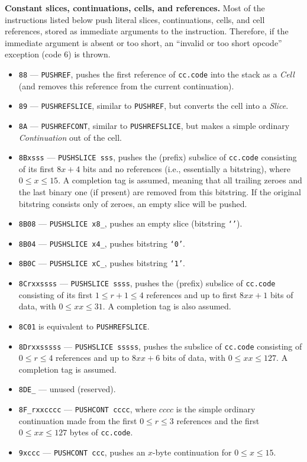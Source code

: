 \documentclass[12pt,oneside]{article}
\def\makepoint#1{\medbreak\noindent{\bf #1.\ }}
\def\nxsubpoint{\refstepcounter{subsubsection}%
    \smallbreak\makepoint{\thesubsubsection}}
\def\emb#1{\textbf{#1.}}
\begin{document}
\nxsubpoint\emb{Constant slices, continuations, cells, and references}
Most of the instructions listed below push literal slices, continuations, cells, and cell references, stored as immediate arguments to the instruction. Therefore, if the immediate argument is absent or too short, an ``invalid or too short opcode'' exception (code $6$) is thrown.
\begin{itemize}
\item {\tt 88} --- {\tt PUSHREF}, pushes the first reference of {\tt cc.code} into the stack as a {\em Cell} (and removes this reference from the current continuation).
\item {\tt 89} --- {\tt PUSHREFSLICE}, similar to {\tt PUSHREF}, but converts the cell into a {\em Slice}.
\item {\tt 8A} --- {\tt PUSHREFCONT}, similar to {\tt PUSHREFSLICE}, but makes a simple ordinary {\em Continuation\/} out of the cell.
\item {\tt 8Bxsss} --- {\tt PUSHSLICE sss}, pushes the (prefix) subslice of {\tt cc.code} consisting of its first $8x+4$ bits and no references (i.e., essentially a bitstring), where $0\leq x\leq15$. A completion tag is assumed, meaning that all trailing zeroes and the last binary one (if present) are removed from this bitstring. If the original bitstring consists only of zeroes, an empty slice will be pushed.
\item {\tt 8B08} --- {\tt PUSHSLICE x8\_}, pushes an empty slice (bitstring {\tt `'}).
\item {\tt 8B04} --- {\tt PUSHSLICE x4\_}, pushes bitstring {\tt `0'}.
\item {\tt 8B0C} --- {\tt PUSHSLICE xC\_}, pushes bitstring {\tt `1'}.
\item {\tt 8Crxxssss} --- {\tt PUSHSLICE ssss}, pushes the (prefix) subslice of {\tt cc.code} consisting of its first $1\leq r+1\leq 4$ references and up to first $8xx+1$ bits of data, with $0\leq xx\leq 31$. A completion tag is also assumed.
\item {\tt 8C01} is equivalent to {\tt PUSHREFSLICE}.
\item {\tt 8Drxxsssss} --- {\tt PUSHSLICE sssss}, pushes the subslice of {\tt cc.code} consisting of $0\leq r\leq 4$ references and up to $8xx+6$ bits of data, with $0\leq xx\leq 127$. A completion tag is assumed.
\item {\tt 8DE\_} --- unused (reserved).
\item {\tt 8F\_rxxcccc} --- {\tt PUSHCONT cccc}, where $cccc$ is the simple ordinary continuation made from the first $0\leq r\leq 3$ references and the first $0\leq xx\leq 127$ bytes of {\tt cc.code}.
\item {\tt 9xccc} --- {\tt PUSHCONT ccc}, pushes an $x$-byte continuation for $0\leq x\leq 15$.
\end{itemize}
\end{document}
